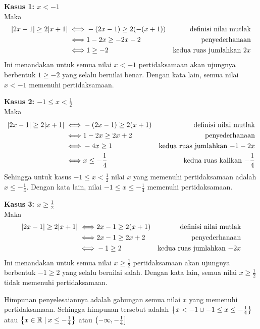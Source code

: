 \begin{enumerate}[leftmargin=*, label={\arabic*}.]

\textbf{Kasus 1: $x < -1$}\\
Maka
\begin{align*}
    \abs{2x-1} \geq 2\abs{x+1} 
    \iff &-(2x-1) \geq 2(-(x+1)) 
    &\text{definisi nilai mutlak} \\
    \iff &1-2x \geq -2x-2
    &\text{penyederhanaan}\\
    \iff &1 \geq -2
    &\text{kedua ruas jumlahkan $2x$}
\end{align*}
Ini menandakan untuk semua nilai $x < -1$ pertidaksamaan akan ujungnya 
berbentuk $1 \geq -2$ yang selalu bernilai benar. Dengan kata lain, semua 
nilai $x < -1$ memenuhi pertidaksamaan.

\textbf{Kasus 2: $-1 \leq x < \frac{1}{2}$}\\
Maka
\begin{align*}
    \abs{2x-1} \geq 2\abs{x+1} 
    \iff &-(2x-1) \geq 2(x+1)
    &\text{definisi nilai mutlak} \\
    \iff &1-2x \geq 2x+2
    &\text{penyederhanaan}\\
    \iff &-4x \geq 1
    &\text{kedua ruas jumlahkan $-1-2x$}\\
    \iff &x \leq -\frac{1}{4}
    &\text{kedua ruas kalikan $-\frac{1}{4}$}
\end{align*}
Sehingga untuk kasus $-1 \leq x < \frac{1}{2}$ nilai $x$ yang memenuhi 
pertidaksamaan adalah $x \leq -\frac{1}{4}$. Dengan kata lain, nilai 
$-1 \leq x \leq -\frac{1}{4}$ memenuhi pertidaksamaan.

\textbf{Kasus 3: $x \geq \frac{1}{2}$}\\
Maka
\begin{align*}
    \abs{2x-1} \geq 2\abs{x+1} 
    \iff &2x-1 \geq 2(x+1)
    &\text{definisi nilai mutlak} \\
    \iff &2x-1 \geq 2x+2
    &\text{penyederhanaan}\\
    \iff &-1 \geq 2
    &\text{kedua ruas jumlahkan $-2x$}
\end{align*}
Ini menandakan untuk semua nilai $x \geq \frac{1}{2}$ pertidaksamaan 
akan ujungnya berbentuk $-1 \geq 2$ yang selalu bernilai salah.
Dengan kata lain, semua nilai $x \geq \frac{1}{2}$ tidak memenuhi 
pertidaksamaan.

Himpunan penyelesaiannya adalah gabungan semua nilai $x$ yang memenuhi 
pertidaksamaan. Sehingga himpunan tersebut adalah 
$\set*{x < -1 \cup -1 \leq x \leq -\frac{1}{4}}$ 
atau $\set*{x \in \mathbb{R} \mid x \leq -\frac{1}{4}}$
atau $\oic*{-\infty,-\frac{1}{4}}$


\end{enumerate}
